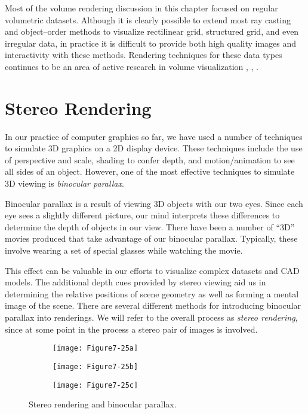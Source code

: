 Most of the volume rendering discussion in this chapter focused on regular volumetric datasets. Although it is clearly possible to extend most ray casting and object--order methods to visualize rectilinear grid, structured grid, and even irregular data, in practice it is difficult to provide both high quality images and interactivity with these methods. Rendering techniques for these data types continues to be an area of active research in volume visualization \cite{Cignoni96}, \cite{Silva96}, \cite{Wilhelms96}.

\section{Stereo Rendering}

In our practice of computer graphics so far, we have used a number of techniques to simulate 3D graphics on a 2D display device. These techniques include the use of perspective and scale, shading to confer depth, and motion/animation to see all sides of an object. However, one of the most effective techniques to simulate 3D viewing is \emph{binocular parallax}.

Binocular parallax is a result of viewing 3D objects with our two eyes. Since each eye sees a slightly different picture, our mind interprets these differences to determine the depth of objects in our view. There have been a number of ``3D'' movies produced that take advantage of our binocular parallax. Typically, these involve wearing a set of special glasses while watching the movie.

This effect can be valuable in our efforts to visualize complex datasets and CAD models. The additional depth cues provided by stereo viewing aid us in determining the relative positions of scene geometry as well as forming a mental image of the scene. There are several different methods for introducing binocular parallax into renderings. We will refer to the overall process as \emph{stereo rendering}, since at some point in the process a stereo pair of images is involved.

\begin{figure}[!htb]
	\centering
	\begin{subfigure}{0.32\linewidth}
		\centering
		\texttt{[image: Figure7-25a]}
		\caption*{}\label{fig:Figure7-25a}
	\end{subfigure}
	\hfill
	\begin{subfigure}{0.32\linewidth}
		\centering
		\texttt{[image: Figure7-25b]}
		\caption*{}\label{fig:Figure7-25b}
	\end{subfigure}%
	\hfill
	\begin{subfigure}{0.32\linewidth}
		\centering
		\texttt{[image: Figure7-25c]}
		\caption*{}\label{fig:Figure7-25c}
	\end{subfigure}%
	\caption{Stereo rendering and binocular parallax.}
	\label{fig:Figure7-25}
\end{figure}

